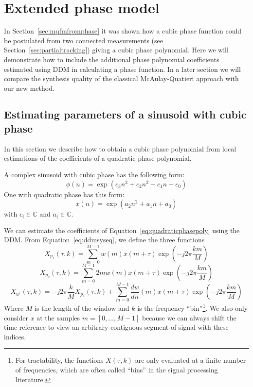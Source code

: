 \chapter{Extended phase model}

In Section~\ref{sec:mqfmfromphase} it was shown how a cubic phase function could
be postulated from two connected measurements (see
Section~\ref{sec:partialtracking}) giving a cubic phase polynomial. Here we will
demonstrate how to include the additional phase polynomial coefficients
estimated using DDM in calculating a phase function. In a later section we will
compare the synthesis quality of the classical McAulay-Quatieri
approach with our new method.

\section{Estimating parameters of a sinusoid with cubic
phase\label{sec:cubicphasepolyest} }

In this section we describe how to obtain a cubic phase polynomial from
local estimations of the coefficients of a quadratic phase polynomial.

A complex sinusoid with cubic phase has the following form:
\begin{equation}
    \label{eq:cubicphasepoly}
    \phi(n) = \exp \left(c_3 n^{3} + c_2 n^{2} + c_1 n + c_0 \right)
\end{equation}
One with quadratic phase has this form:
\begin{equation}
    \label{eq:quadraticphasepoly}
    x(n) = \exp \left(a_2 n^{2} + a_1 n + a_0 \right)
\end{equation}
with $c_{i} \in \mathbb{C}$ and $a_{i} \in \mathbb{C}$.

We can estimate the coefficients of Equation~\ref{eq:quadraticphasepoly} using the DDM. From
Equation~\ref{eq:ddmsyseq}, we define the three functions
\begin{equation}
    X_{p_{1}} \left( \tau, k \right)
    =
    \sum_{m=0}^{M-1} w(m) x(m + \tau) \exp(-j 2 \pi \frac{k m}{M})
\end{equation}
\begin{equation}
    X_{p_{2}} \left( \tau, k \right)
    =
    \sum_{m=0}^{M-1} 2 m w(m) x(m + \tau) \exp(-j 2 \pi \frac{k m}{M})
\end{equation}
\begin{equation}
    X_{w^{\prime}} \left( \tau, k \right)
    =
    -j 2 \pi \frac{k}{M} X_{p_{1}} \left( \tau , k \right) + 
    \sum_{m=0}^{M-1} \frac{dw}{dn}(m) x(m + \tau) \exp(-j 2 \pi \frac{k m}{M})
\end{equation}
Where $M$ is the length of the window and $k$ is the frequency
``bin''\footnote{For tractability, the functions $X(\tau,k)$ are only evaluated at
    a finite number of frequencies, which are often called ``bins'' in the
signal processing literature.}. We also
only consider $x$ at the samples $m = [0, \dotsc, M-1]$ because we can always
shift the time reference to view an arbitrary contiguous segment of signal with
these indices.

